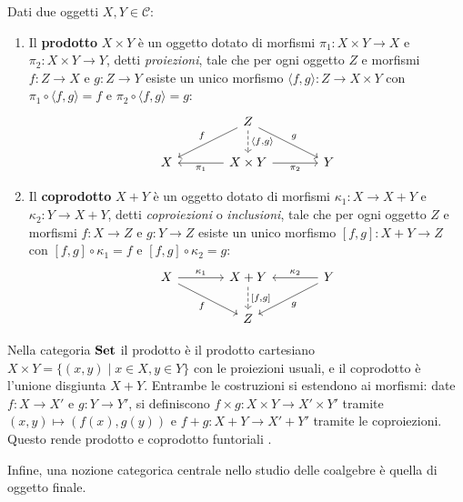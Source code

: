\begin{definition}
  Dati due oggetti \(X, Y \in \mathcal{C}\):
  \begin{enumerate}
    \item Il \textbf{prodotto} \(X \times Y\) è un oggetto dotato di morfismi \(\pi_1 : X \times Y \to X\) e \(\pi_2 : X \times Y \to Y\), detti \textit{proiezioni}, tale che per ogni oggetto \(Z\) e morfismi \(f : Z \to X\) e \(g : Z \to Y\) esiste un unico morfismo \(\langle f, g \rangle : Z \to X \times Y\) con \(\pi_1 \circ \langle f, g \rangle = f\) e \(\pi_2 \circ \langle f, g \rangle = g\):
          \[
            \begin{tikzcd}[column sep=large]
              & Z \arrow[dl, "f"'] \arrow[dr, "g"] \arrow[d, dashed, "\langle f{,}g \rangle"] & \\
              X & X \times Y \arrow[l, "\pi_1"] \arrow[r, "\pi_2"'] & Y
            \end{tikzcd}
          \]
    \item Il \textbf{coprodotto} \(X + Y\) è un oggetto dotato di morfismi \(\kappa_1 : X \to X + Y\) e \(\kappa_2 : Y \to X + Y\), detti \textit{coproiezioni} o \textit{inclusioni}, tale che per ogni oggetto \(Z\) e morfismi \(f : X \to Z\) e \(g : Y \to Z\) esiste un unico morfismo \([f, g] : X + Y \to Z\) con \([f, g] \circ \kappa_1 = f\) e \([f, g] \circ \kappa_2 = g\):
          \[
            \begin{tikzcd}[column sep=large]
              X \arrow[r, "\kappa_1"] \arrow[dr, "f"'] & X + Y \arrow[d, dashed, "{[f,g]}"] & Y \arrow[l, "\kappa_2"'] \arrow[dl, "g"] \\
              & Z &
            \end{tikzcd}
          \]
  \end{enumerate}
\end{definition}

Nella categoria \(\operatorname{\mathbf{Set}}\) il prodotto è il prodotto cartesiano \(X \times Y = \{(x, y) \mid x \in X, y \in Y\}\) con le proiezioni usuali, e il coprodotto è l'unione disgiunta \(X + Y\). Entrambe le costruzioni si estendono ai morfismi: date \(f : X \to X'\) e \(g : Y \to Y'\), si definiscono \(f \times g : X \times Y \to X' \times Y'\) tramite \((x, y) \mapsto (f(x), g(y))\) e \(f + g : X + Y \to X' + Y'\) tramite le coproiezioni. Questo rende prodotto e coprodotto funtoriali \cite{jacobs2017}.

Infine, una nozione categorica centrale nello studio delle coalgebre è quella di oggetto finale.

